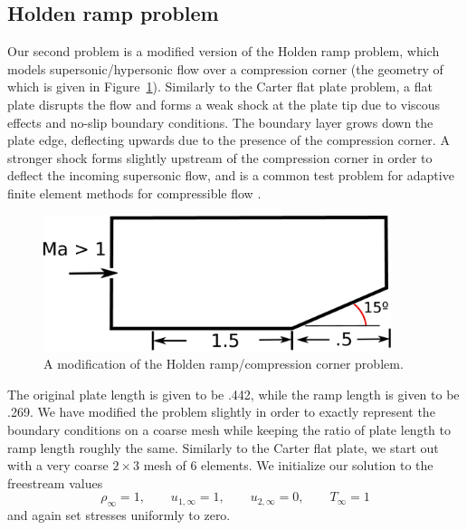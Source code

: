 
\subsection{Holden ramp problem}

Our second problem is a modified version of the Holden ramp problem, which models supersonic/hypersonic flow over a compression corner (the geometry of which is given in Figure~\ref{fig:holdenCartoon}).  Similarly to the Carter flat plate problem, a flat plate disrupts the flow and forms a weak shock at the plate tip due to viscous effects and no-slip boundary conditions.  The boundary layer grows down the plate edge, deflecting upwards due to the presence of the compression corner.  A stronger shock forms slightly upstream of the compression corner in order to deflect the incoming supersonic flow, and is a common test problem for adaptive finite element methods for compressible flow \cite{Rachowicz1997231,Barter,BenKirk}.  

\begin{figure}
\centering
\includegraphics[width=4in]{figs/holden.eps}
\caption{A modification of the Holden ramp/compression corner problem.}
\label{fig:holdenCartoon}
\end{figure}

The original plate length is given to be .442, while the ramp length is given to be .269. We have modified the problem slightly in order to exactly represent the boundary conditions on a coarse mesh while keeping the ratio of plate length to ramp length roughly the same. Similarly to the Carter flat plate, we start out with a very coarse $2 \times 3$ mesh of 6 elements.  We initialize our solution to the freestream values
\[
\rho_{\infty} = 1,\qquad u_{1,\infty}= 1,\qquad u_{2,\infty} = 0, \qquad T_{\infty} = 1
\]
and again set stresses uniformly to zero.   


